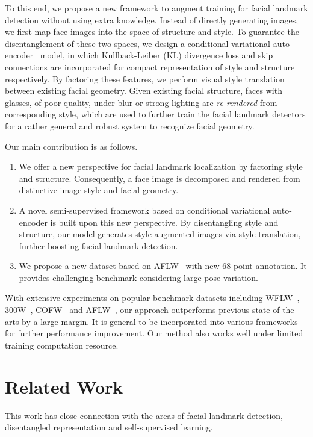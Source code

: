 \documentclass[10pt,twocolumn,letterpaper]{article}
\begin{document}
To this end, we propose a new framework to augment training for facial landmark detection without using extra knowledge. Instead of directly generating images, we first map face images into the space of structure and style. To guarantee the disentanglement of these two spaces, we design a conditional variational auto-encoder~\cite{kingma2013auto} model, in which Kullback-Leiber (KL) divergence loss and skip connections are incorporated for compact representation of style and structure respectively. By factoring these features, we perform visual style translation between existing facial geometry. Given existing facial structure, faces with glasses, of poor quality, under blur or strong lighting are {\it re-rendered} from corresponding style, which are used to further train the facial landmark detectors for a rather general and  robust system to recognize facial geometry. 

Our main contribution is as follows.

\begin{enumerate}
    \item We offer a new perspective for facial landmark localization by factoring style and structure. Consequently, a face image is decomposed and rendered from distinctive image style and facial geometry. 
    \item A novel semi-supervised framework based on conditional variational auto-encoder is built upon this new perspective. By disentangling style and structure, our model generates style-augmented images via style translation, further boosting facial landmark detection. 
    \item We propose a new dataset based on AFLW~\cite{AFLW} with new 68-point annotation. It provides challenging benchmark considering large pose variation. 
\end{enumerate}

With extensive experiments on popular benchmark datasets including WFLW~\cite{LAB}, 300W~\cite{sagonas2013300}, COFW~\cite{burgos2013robust} and AFLW~\cite{AFLW}, our approach outperforms previous state-of-the-arts by a large margin. It is general to be incorporated into various frameworks for further performance improvement. Our method also works well under limited training computation resource.

\section{Related Work}

This work has close connection with the areas of facial landmark detection, disentangled representation and self-supervised learning.
\end{document}
